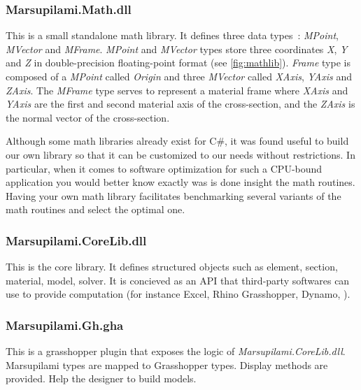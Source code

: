 \subsubsection{Marsupilami.Math.dll}
This is a small standalone math library. It defines three data types~: \textit{MPoint}, \textit{MVector} and \textit{MFrame}. \textit{MPoint} and \textit{MVector} types store three coordinates \textit{X}, \textit{Y} and \textit{Z} in double-precision floating-point format (see \cref{fig:mathlib}). \textit{Frame} type is composed of a \textit{MPoint} called \textit{Origin} and three \textit{MVector} called \textit{XAxis}, \textit{YAxis} and \textit{ZAxis}. The \textit{MFrame} type serves to represent a material frame where \textit{XAxis} and \textit{YAxis} are the first and second material axis of the cross-section, and the \textit{ZAxis} is the normal vector of the cross-section.

Although some math libraries already exist for C\#, it was found useful to build our own library so that it can be customized to our needs without restrictions. In particular, when it comes to software optimization for such a CPU-bound application you would better know exactly was is done insight the math routines. Having your own math library facilitates benchmarking several variants of the math routines and select the optimal one.



\subsubsection{Marsupilami.CoreLib.dll}
This is the core library. It defines structured objects such as element, section, material, model, solver. It is concieved as an API that third-party softwares can use to provide computation (for instance Excel, Rhino Grasshopper, Dynamo, \telp{}).

\subsubsection{Marsupilami.Gh.gha}
This is a grasshopper plugin that exposes the logic of \textit{Marsupilami.CoreLib.dll}. Marsupilami types are mapped to Grasshopper types. Display methods are provided. Help the designer to build models.


